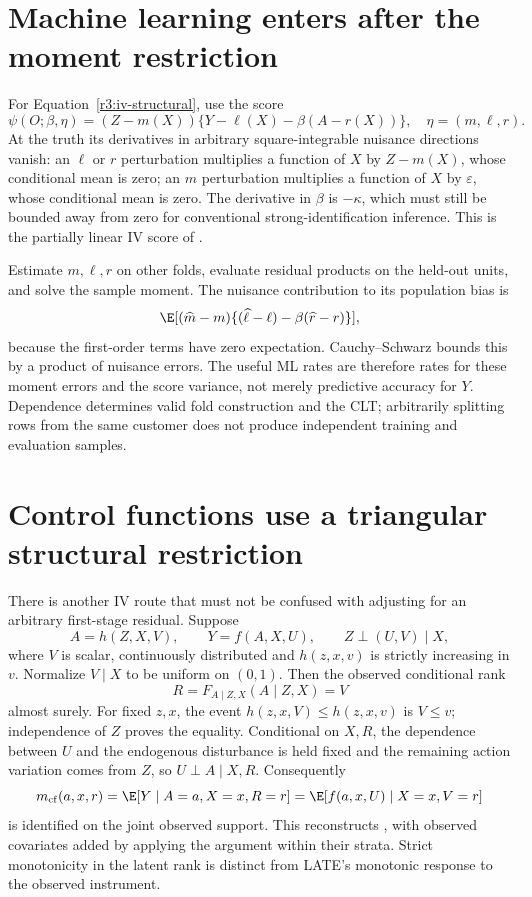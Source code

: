 \section{Machine learning enters after the moment restriction}
\label{r3:iv-ml}
For Equation~\eqref{r3:iv-structural}, use the score
\begin{equation}
 \psi(O;\beta,\eta)=(Z-m(X))
       \{Y-\ell(X)-\beta(A-r(X))\},\quad \eta=(m,\ell,r).
 \label{r3:pliv-score}
\end{equation}
At the truth its derivatives in arbitrary square-integrable nuisance
directions vanish: an $\ell$ or $r$ perturbation multiplies a function
of $X$ by $Z-m(X)$, whose conditional mean is zero; an $m$ perturbation
multiplies a function of $X$ by $\varepsilon$, whose conditional mean
is zero. The derivative in $\beta$ is $-\kappa$, which must still be
bounded away from zero for conventional strong-identification inference.
This is the partially linear IV score of
\citet[Section 4.2, Equations (4.5)--(4.8)]{dml2018}.

Estimate $m,\ell,r$ on other folds, evaluate residual products on the
held-out units, and solve the sample moment. The nuisance contribution
to its population bias is
\[
 \E[(\widehat m-m)\{(\widehat\ell-\ell)
                         -\beta(\widehat r-r)\}],
\]
because the first-order terms have zero expectation. Cauchy--Schwarz
bounds this by a product of nuisance errors. The useful ML rates are
therefore rates for these moment errors and the score variance, not
merely predictive accuracy for $Y$. Dependence determines valid fold
construction and the CLT; arbitrarily splitting rows from the same
customer does not produce independent training and evaluation samples.

\section{Control functions use a triangular structural restriction}
\label{r3:control-function}
There is another IV route that must not be confused with adjusting
for an arbitrary first-stage residual. Suppose
\[
 A=h(Z,X,V),\qquad Y=f(A,X,U),\qquad
 Z\perp(U,V)\mid X,
\]
where $V$ is scalar, continuously distributed and $h(z,x,v)$ is
strictly increasing in $v$. Normalize $V\mid X$ to be uniform on
$(0,1)$. Then the observed conditional rank
\begin{equation}
 R=F_{A\mid Z,X}(A\mid Z,X)=V
 \label{r3:control-rank}
\end{equation}
almost surely. For fixed $z,x$, the event
$h(z,x,V)\le h(z,x,v)$ is $V\le v$; independence of $Z$ proves
the equality. Conditional on $X,R$, the dependence between $U$ and
the endogenous disturbance is held fixed and the remaining action
variation comes from $Z$, so $U\perp A\mid X,R$. Consequently
\[
 m_{\rm cf}(a,x,r)=\E[Y\mid A=a,X=x,R=r]
                 =\E[f(a,x,U)\mid X=x,V=r]
\]
is identified on the joint observed support. This reconstructs
\citet[Assumptions 3.1--3.2, Theorem 1 and Appendix A]{imbens2002},
with observed covariates added by applying the argument within their
strata. Strict monotonicity in the latent rank is distinct from
LATE's monotonic response to the observed instrument.

